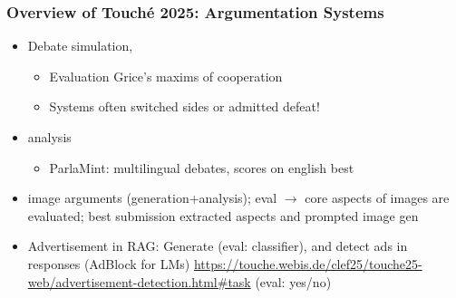 \documentclass[a4paper]{article}
\begin{document}
\subsubsection{Overview of Touché 2025: Argumentation Systems}
\begin{itemize}
    \item Debate simulation,
          \begin{itemize}
              \item  Evaluation Grice's maxims of cooperation
              \item Systems often switched sides or admitted defeat!
          \end{itemize}
    \item analysis
          \begin{itemize}
              \item ParlaMint: multilingual debates, scores on english best
          \end{itemize}
    \item image arguments (generation+analysis); eval $\rightarrow$ core aspects of images are evaluated; best submission extracted aspects and prompted image gen
    \item Advertisement in RAG: Generate (eval: classifier), and detect ads in responses (AdBlock for LMs) \url{https://touche.webis.de/clef25/touche25-web/advertisement-detection.html#task} (eval: yes/no)
\end{itemize}
\end{document}
